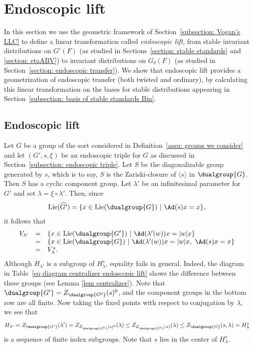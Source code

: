 \documentclass[11pt,letterpaper]{amsart}
\numberwithin{equation}{section}
\begin{document}
\section{Endoscopic lift}\label{section: endoscopic lift}




In this section we use the geometric framework of Section~\ref{subsection: Vogan's LLC} to define a linear transformation called {\it endoscopic lift}, from stable invariant distributions on $G'(F)$ (as studied in Sections~\ref{section: stable standards} and \ref{section: etaABV}) to invariant distributions on $G_\delta(F)$ (as studied in Section~\ref{section: endoscopic transfer}). 
We show that endoscopic lift provides a geometrization of endoscopic transfer (both twisted and ordinary), by  calculating this linear transformation on the bases for stable distributions appearing in Section~\ref{subsection: basis of stable standards Bin}.

\subsection{Endoscopic lift}\label{subsection: Lift}

Let $G$ be a group of the sort considered in Definition~\ref{assu: groups we consider} and let
$(G',s, \xi)$ be an endoscopic triple for $G$ as discussed in Section~\ref{subsection: endoscopic triple}.
Let $S$ be the diagonalizable group generated by $s$, which is to say, $S$ is the Zariski-closure of $\langle s \rangle$ in $\dualgroup{G}$.
Then $S$ has a cyclic component group.
Let $\lambda'$ be an infinitesimal parameter for $G'$ and set $\lambda = \xi \circ \lambda'$. Then, since 
\[\textrm{Lie}(\widehat{G'})= \{ x \in \textrm{Lie}(\dualgroup{G})\ | \ \Ad(s)x=x\},\]
it follows that 
\[
\begin{array}{rcl}
V_{\lambda'}
&=& \{ x \in \textrm{Lie}(\dualgroup{G'})\ | \ \Ad(\lambda'(w))x=|w|x\} \\
&=& \{ x \in \textrm{Lie}(\dualgroup{G})\ | \ \Ad(\lambda'(w))x=|w|x,\ \Ad(s)x=x \} \\
&=& V_{\lambda}^{s}. 
\end{array}
\]
Although $H_{\lambda'}$ is a subgroup of $H_{\lambda}^{s}$, equality fails in general. Indeed, the diagram in Table~\ref{eq diagram centralizer endoscopic lift} shows the difference between these groups (see Lemma \ref{lem centralizer}).
Note that $\dualgroup{G'}= Z_{\dualgroup{G^0}}(s)^0$, and the component groups in the bottom row are all finite. Now taking the fixed points with respect to conjugation by $\lambda$, we see that 
\[ 
H_{\lambda'}= 
Z_{\dualgroup{G'}}(\lambda')
= Z_{Z_{{\dualgroup{G^0}}} (s)^0}(\lambda) \leq Z_{Z_{{\dualgroup{G^0}}} (s)}(\lambda)  \leq Z_{{\dualgroup{G}}} (s,\lambda) = H_{\lambda}^{s} \]
 is a sequence of finite index subgroups. Note that $s$ lies in the center of $ H_{\lambda}^{s}$. 
\end{document}
